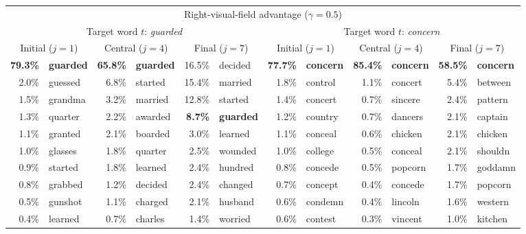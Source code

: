 \documentclass[doc,biblatex,floatsintext]{apa7}
\begin{document}
\begin{table}
\begin{adjustwidth}{-0.68in}{-0.68in}
\begin{center}
\begin{threeparttable}
\begin{tabular}{rlrlrlrlrlrl}
\midrule
\multicolumn{12}{c}{Right-visual-field advantage ($\gamma = 0.5$)} \\
\multicolumn{6}{c}{Target word $t$: \textit{guarded}} & \multicolumn{6}{c}{Target word $t$: \textit{concern}} \\
\multicolumn{2}{c}{Initial ($j=1$)} & \multicolumn{2}{c}{Central ($j=4$)} & \multicolumn{2}{c}{Final ($j=7$)} & \multicolumn{2}{c}{Initial ($j=1$)} & \multicolumn{2}{c}{Central ($j=4$)} & \multicolumn{2}{c}{Final ($j=7$)} \\
\textbf{79.3\%}     & \textbf{guarded} & \textbf{65.8\%}  & \textbf{guarded} & 16.5\% & decided & \textbf{77.7\%}  & \textbf{concern} & \textbf{85.4\%}  & \textbf{concern} & \textbf{58.5\%} & \textbf{concern} \\
2.0\%      & guessed & 6.8\%   & started & 15.4\% & married & 1.8\%   & control & 1.1\%   & concert & 5.4\%  & between \\
1.5\%      & grandma & 3.2\%   & married & 12.8\% & started & 1.4\%   & concert & 0.7\%   & sincere & 2.4\%  & pattern \\
1.3\%      & quarter & 2.2\%   & awarded & \textbf{8.7\%}  & \textbf{guarded} & 1.2\%   & country & 0.7\%   & dancers & 2.1\%  & captain \\
1.1\%      & granted & 2.1\%   & boarded & 3.0\%  & learned & 1.1\%   & conceal & 0.6\%   & chicken & 2.1\%  & chicken \\
1.0\%      & glasses & 1.8\%   & quarter & 2.5\%  & wounded & 1.0\%   & college & 0.5\%   & conceal & 2.1\%  & shouldn \\
0.9\%      & started & 1.8\%   & learned & 2.4\%  & hundred & 0.8\%   & concede & 0.5\%   & popcorn & 1.7\%  & goddamn \\
0.8\%      & grabbed & 1.2\%   & decided & 2.4\%  & changed & 0.7\%   & concept & 0.4\%   & concede & 1.7\%  & popcorn \\
0.5\%      & gunshot & 1.1\%   & charged & 2.1\%  & husband & 0.6\%   & condemn & 0.4\%   & lincoln & 1.6\%  & western \\
0.4\%      & learned & 0.7\%   & charles & 1.4\%  & worried & 0.6\%   & contest & 0.3\%   & vincent & 1.0\%  & kitchen \\
\bottomrule
\end{tabular}
\end{threeparttable}
\end{center}
\end{adjustwidth}
\end{table}
\end{document}
